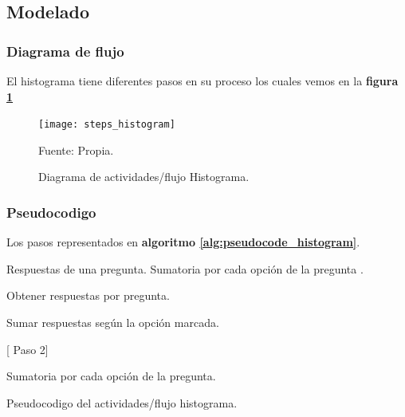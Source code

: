 \subsection{Modelado}

\subsubsection{Diagrama de flujo}

El histograma tiene diferentes pasos en su proceso los cuales vemos en la \textbf{ figura \ref{fig:steps_histogram}}

\begin{figure}[H]
	\begin{center}
		\texttt{[image: steps\_histogram]}
	\end{center}
	\begin{center}
		\vskip -0.5cm
		\caption{\label{fig:steps_histogram}\small{Diagrama de actividades/flujo Histograma. }}
		{\small{Fuente: Propia.}}
	\end{center}
\end{figure}


\subsubsection{Pseudocodigo}
Los pasos representados en \textbf{ algoritmo \ref{alg:pseudocode_histogram}}.

\begin{algorithm}[H]
	\begin{algorithmic}[2]
		\REQUIRE Respuestas de una pregunta.  %
		\ENSURE Sumatoria por cada opción de la pregunta .                                                       %
		
		\STATE Obtener respuestas por pregunta.
		
		\STATE Sumar respuestas según la opción marcada. 
		
	
		 [ Paso 2]
		\ENDIF
		
		\RETURN  Sumatoria por cada opción de la pregunta.
		
		\begin{center}
			\vskip -0.5cm
			\caption{\label{alg:pseudocode_histogram}\small{Pseudocodigo del actividades/flujo histograma.}}
		\end{center}
		
	\end{algorithmic}
\end{algorithm}


